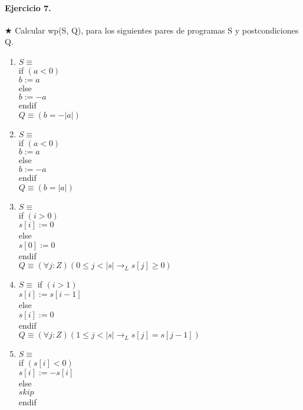 \documentclass{article}
\begin{document}
\paragraph{Ejercicio 7.} $\bigstar$ Calcular wp(S, Q), para los siguientes pares de programas S y postcondiciones Q.

\begin{enumerate}[label=\alph*)]
\item $S \equiv$\\
   if $( a < 0 )$\\
      $b := a$\\
   else\\
      $b := -a$\\
   endif\\

   $Q \equiv (b = -|a|)$\\
\item $S \equiv$\\
   if $( a < 0 )$\\
     $ b := a$\\
   else\\
     $ b := -a$\\
   endif\\

   $Q \equiv (b = |a|)$\\

\item $S \equiv$\\
   if $( i > 0 )$\\
     $ s [ i ] := 0$\\
   else\\
     $ s [ 0 ] := 0$\\
   endif\\

   $Q \equiv (\forall j :Z)(0 \leq j < |s| \rightarrow_L s[j] \geq 0)$\\
\item $S \equiv$
   if $( i > 1 )$\\
      $s [ i ] := s [ i -1]$\\
   else\\
     $ s [ i ] := 0$\\
   endif\\

   $Q \equiv (\forall j :Z)(1 \leq j < |s| \rightarrow_L s[j] = s[j - 1])$\\

\item $S \equiv$\\
   if $( s [ i ] < 0 )$\\
     $ s [ i ] := -s [ i ]$\\
   else\\
      $skip$\\
   endif\\


\end{enumerate}
\end{document}
